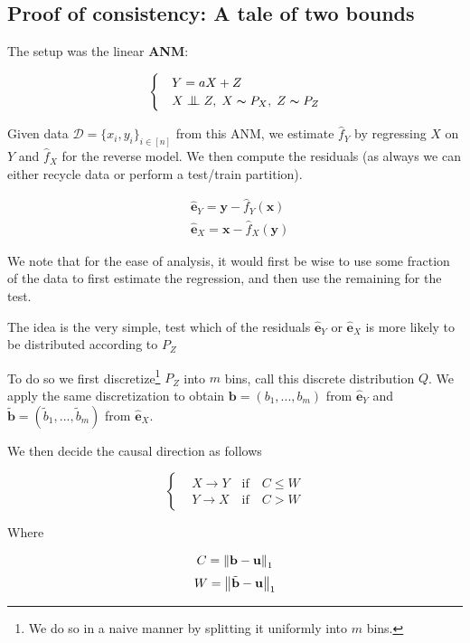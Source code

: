 \subsection{Proof of consistency: A tale of two bounds}

The setup was the linear \textbf{ANM}:

\[ \begin{cases} 
    & Y = aX + Z  \\
    & X \bigCI Z,\; X \thicksim P_X,\; Z \thicksim P_{Z}  
 \end{cases}
\]

Given data $\mathcal{D} = \{x_i, y_i\}_{i \in [n]}$ from this ANM, we 
estimate $\hat{f}_Y$ by regressing $X$ on $Y$ and 
$\hat{f}_X$ for the reverse model. We then compute the residuals (as always we can 
either recycle data or perform a test/train partition). 

\begin{align}
    &  \hat{\mathbf{e}}_Y = \mathbf{y} - \hat{f}_Y(\mathbf{x})\\
    &  \hat{\mathbf{e}}_X = \mathbf{x} - \hat{f}_X(\mathbf{y})
\end{align}

We note that for the ease of analysis, it would first be wise to use some fraction 
of the data to first estimate the regression, and then use the remaining for the test.

The idea is the very simple, test which of the residuals $\hat{\mathbf{e}}_Y$ or 
$\hat{\mathbf{e}}_X$ is more likely to be distributed according to $P_Z$

To do so we first discretize\footnote{We do so in a naive manner by splitting
it uniformly into $m$ bins.} $P_{Z}$ into $m$ bins, call this discrete distribution
$Q$. We apply the same discretization to obtain $\mathbf{b} = (b_1, ..., b_m)$ from $\hat{\mathbf{e}}_Y$
and $\tilde{\mathbf{b}} = (\tilde{b}_1, ..., \tilde{b}_m)$ from $\hat{\mathbf{e}}_X$.

We then decide the causal direction as follows

\[ \begin{cases} 
    & X \rightarrow Y \quad \text{if} \quad C \leq W  \\
    & Y \rightarrow X \quad \text{if} \quad C > W  
 \end{cases}
\]

Where 

$$
    C = \left\lVert\mathbf{b} - \mathbf{u}\right\rVert_{1} 
$$
$$
    W = \left\lVert\tilde{\mathbf{b}} - \mathbf{u}\right\rVert_{1}
$$


